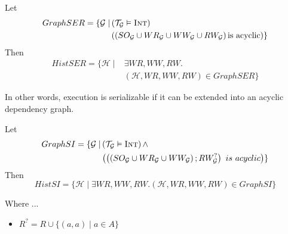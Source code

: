 \documentclass{beamer}
\begin{document}
\begin{frame}
	\begin{theorem}
		Let
		$$
		\begin{aligned}
			GraphSER = \{ \mathcal{G} \mid & \left( \mathcal{T}_\mathcal{G} \vDash \textsc{Int} \right) \\
			      & \left(
		      		\left(
		    	  	 SO_\mathcal{G} \cup WR_\mathcal{G} \cup WW_\mathcal{G} \cup RW_\mathcal{G}
			      	\right) \text{is acyclic}
			        \right) \}
		\end{aligned}
		$$
		Then 
		$$
		\begin{aligned}
			HistSER = \{ \mathcal{H} \mid & \exists WR, WW, RW. \\
			& \left( \mathcal{H}, WR, WW, RW \right) \in GraphSER \}
		\end{aligned}
		$$	
	\end{theorem}
	In other words, execution is serializable if it can be extended into an acyclic dependency graph.
\end{frame}


\begin{frame}
	\begin{theorem}
		Let
		$$
			\begin{aligned}
			GraphSI = 
				\{ 
					\mathcal{G} 
					\mid &
					\left( \mathcal{T}_\mathcal{G} \vDash \textsc{Int} \right) \wedge \\
						 & \left(
							\left(
								\left(
									SO_\mathcal{G} \cup WR_\mathcal{G} \cup WW_\mathcal{G}
								\right)  ; RW_\mathcal{G}^?
						\right) \ is \ acyclic
					\right)
				\}	
			\end{aligned}
		$$
		Then
		$$
			HistSI = \{ \mathcal{H} \mid \exists WR, WW, RW. (\mathcal{H}, WR, WW, RW) \in GraphSI \}
		$$
	\end{theorem}
	Where ...
	\begin{itemize}
		\item $R^? = R \cup \{ (a, a) \mid a \in A \}$
	\end{itemize}
\end{frame}
\end{document}
